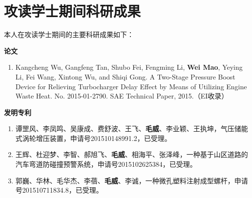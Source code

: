\section*{攻读学士期间科研成果}
本人在攻读学士期间的主要科研成果如下：

{\bfseries 论文}
\begin{enumerate}[fullwidth,leftmargin=3em,labelwidth=1em,labelsep=0pt,itemindent=0pt,partopsep=0pt,parsep=0pt,topsep=0pt,itemsep=0pt,label=\arabic*.]
	\item Kangcheng Wu, Gangfeng Tan, Shubo Fei, Fengming Li, {\bfseries Wei Mao}, Yeying Li, Fei Wang, Xintong Wu, and Shiqi Gong. A Two-Stage Pressure Boost Device for Relieving Turbocharger Delay Effect by Means of Utilizing Engine Waste Heat. No. 2015-01-2790. SAE Technical Paper, 2015.（EI收录）
\end{enumerate}

{\bfseries 发明专利}
\begin{enumerate}[fullwidth,leftmargin=3em,labelwidth=1em,labelsep=0pt,itemindent=0pt,partopsep=0pt,parsep=0pt,topsep=0pt,itemsep=0pt,label=\arabic*.]
	\item 谭罡风、李凤鸣、吴康成、费舒波、王飞、{\bfseries 毛威}、李业颖、王执坤，气压储能式涡轮增压装置，申请号201510148991.2，已受理。
	\item 王辉、杜迎梦、李智、郝旭飞、{\bfseries 毛威}、相海平、张泽峰，一种基于山区道路的汽车弯道防碰撞预警系统，申请号2015102625384，已受理。
	\item 郭巍、华林、毛华杰、李蓓、{\bfseries 毛威}、李诚，一种微孔塑料注射成型螺杆，申请号201510711834.8，已受理。
\end{enumerate}




